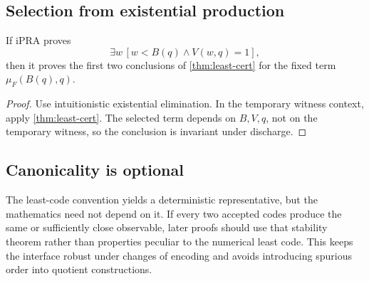 \subsection{Selection from existential production}

\begin{theorem}\label{thm:witness-erasure}
If iPRA proves
\[
  \exists w\,[w<B(q)\wedge V(w,q)=1],
\]
then it proves the first two conclusions of \cref{thm:least-cert} for the fixed
term \(\mu_F(B(q),q)\).
\end{theorem}

\begin{proof}
Use intuitionistic existential elimination.  In the temporary witness context,
apply \cref{thm:least-cert}.  The selected term depends on \(B,V,q\), not on the
temporary witness, so the conclusion is invariant under discharge.
\end{proof}

\subsection{Canonicality is optional}

The least-code convention yields a deterministic representative, but the
mathematics need not depend on it.  If every two accepted codes produce the
same or sufficiently close observable, later proofs should use that stability
theorem rather than properties peculiar to the numerical least code.  This
keeps the interface robust under changes of encoding and avoids introducing
spurious order into quotient constructions.

